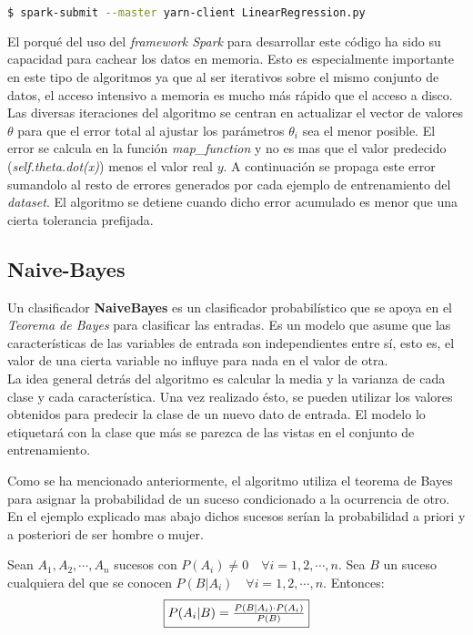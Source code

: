 \begin{lstlisting}[language=bash, numbers=none]
$ spark-submit --master yarn-client LinearRegression.py
\end{lstlisting}

El porqué del uso del \textit{framework Spark} para desarrollar este código ha sido su capacidad para cachear 
los datos en memoria. Esto es especialmente importante en este tipo de algoritmos ya que al ser iterativos sobre 
el mismo conjunto de datos, el acceso intensivo a memoria es mucho más rápido que el acceso a disco.\\
Las diversas iteraciones del algoritmo se centran en actualizar el vector de valores $\theta$ para que el error
total al ajustar los parámetros $\theta_i$ sea el menor posible. El error se calcula en la función \textit{map\_function} 
y no es mas que el valor predecido (\textit{self.theta.dot(x)}) menos el valor real $y$. A continuación se propaga
este error sumandolo al resto de errores generados por cada ejemplo de entrenamiento del \textit{dataset}. El algoritmo
se detiene cuando dicho error acumulado es menor que una cierta tolerancia prefijada.

\clearpage

\subsection{Naive-Bayes}
Un clasificador \textbf{NaiveBayes} es un clasificador probabilístico que se apoya en el 
\textit{Teorema de Bayes} para clasificar las entradas.
Es un modelo que asume que las características de las variables de entrada son independientes 
entre sí, esto es, el valor de una cierta variable no influye para nada en el valor de otra.\\
La idea general detrás del algoritmo es calcular la media y la varianza de cada clase y cada característica.
Una vez realizado ésto, se pueden utilizar los valores obtenidos para predecir la clase de un nuevo 
dato de entrada. El modelo lo etiquetará con la clase que más se parezca de las vistas en el 
conjunto de entrenamiento.
\newline

Como se ha mencionado anteriormente, el algoritmo utiliza el teorema de Bayes para asignar la probabilidad de
un suceso condicionado a la ocurrencia de otro. En el ejemplo explicado mas abajo dichos sucesos serían la
probabilidad a priori y a posteriori de ser hombre o mujer.

\begin{theorem}
  Sean ${A_1, A_2, \cdots, A_n}$ sucesos con $P(A_i) \neq 0 \quad \forall i=1, 2, \cdots, n$. 
  Sea $B$ un suceso cualquiera del que se conocen $P(B|A_i) \quad \forall i=1, 2, \cdots, n$.
  Entonces:
  {\fboxsep 8pt\fboxrule 1pt
  \begin{equation*}
  \fbox{$ P(A_i|B) = \frac{P(B|A_i) \cdot P(A_i)}{P(B)} $}
  \end{equation*}
  }
\end{theorem}

